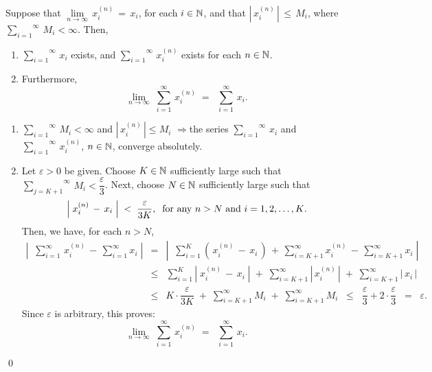 \begin{lemma}\label{WeierstrassMTest}
\mbox{}\vskip 0.1cm
\noindent
Suppose that $\underset{n\rightarrow\infty}{\lim}\,x^{(n)}_{i} \,=\, x_{i}$,\; for each $i \in \mathbb{N}$,
and that $\left\vert\,x^{(n)}_{i}\,\right\vert \,\leq\, M_{i}$,
where $\overset{\infty}{\underset{i=1}{\sum}}\,M_{i} < \infty$.
Then,
\begin{enumerate}
\item
	$\overset{\infty}{\underset{i=1}{\sum}}\, x_{i}$ exists, \;and\;\;
	$\overset{\infty}{\underset{i=1}{\sum}}\, x^{(n)}_{i}$ exists for each $n \in \mathbb{N}$.
\item	Furthermore,
	\begin{equation*}
	\underset{n\rightarrow\infty}{\lim}\;\overset{\infty}{\underset{i=1}{\sum}}\, x^{(n)}_{i}
	\; = \;\;
	\overset{\infty}{\underset{i=1}{\sum}}\, x_{i}.
	\end{equation*}
\end{enumerate}
\end{lemma}
\proof
\begin{enumerate}
\item
	$\overset{\infty}{\underset{i=1}{\sum}}\,M_{i} < \infty$ \;\;and\;\; $\left\vert\,x^{(n)}_{i}\,\right\vert \leq M_{i}$
	\quad$\Longrightarrow$\quad the series \;$\overset{\infty}{\underset{i=1}{\sum}}\, x_{i}$ \;and\;
	$\overset{\infty}{\underset{i=1}{\sum}}\, x^{(n)}_{i}$, $n \in \mathbb{N}$, \;converge absolutely.
\item
	Let $\varepsilon > 0$ be given. Choose $K \in \mathbb{N}$ sufficiently large such that
	$\overset{\infty}{\underset{j = K + 1}{\sum}}\,M_{i} < \dfrac{\varepsilon}{3}$.
	Next, choose $N \in \mathbb{N}$ sufficiently large such that
	\begin{equation*}
	\left\vert\;x^{(n)}_{i} \,-\, x_{i}\;\right\vert
	\; < \; \dfrac{\varepsilon}{3K},
	\;\;\textnormal{for any $n > N$ and $i = 1, 2, \ldots, K$}.
	\end{equation*}
	Then, we have, for each $n > N$,
	\begin{eqnarray*}
	\left\vert\;\;
	\sum^{\infty}_{i=1}\,x^{(n)}_{i} \, - \, \sum^{\infty}_{i=1}x_{i}
	\;\right\vert
	&=&
	\left\vert\;\;
	\sum^{K}_{i=1}\left(\,x^{(n)}_{i} \, - \, x_{i}\,\right) \, + \, \sum_{i=K+1}^{\infty}x^{(n)}_{i} \, - \, \sum^{\infty}_{i=K+1}x_{i}
	\;\right\vert
	\\
	&\leq&
	\sum^{K}_{i=1}
	\left\vert\; x^{(n)}_{i} \, - \, x_{i}\;\right\vert
	\;+\; \sum^{\infty}_{i=K+1}\left\vert\, x^{(n)}_{i} \,\right\vert
	\;+\; \sum^{\infty}_{i=K+1}\left\vert\, x_{i} \,\right\vert
	\\
	&\leq&
	K \cdot \dfrac{\varepsilon}{3K}
	\;+\; \sum^{\infty}_{i=K+1}M_{i}
	\;+\; \sum^{\infty}_{i=K+1}M_{i}
	\;\;\leq\;\;
	\dfrac{\varepsilon}{3} + 2\cdot\dfrac{\varepsilon}{3}
	\;\;=\;\; \varepsilon.
	\end{eqnarray*}
	Since $\varepsilon$ is arbitrary, this proves:
	\begin{equation*}
	\underset{n\rightarrow\infty}{\lim}\;\overset{\infty}{\underset{i=1}{\sum}}\, x^{(n)}_{i}
	\; = \;\;
	\overset{\infty}{\underset{i=1}{\sum}}\, x_{i}.
	\end{equation*}
\end{enumerate}
\qed


